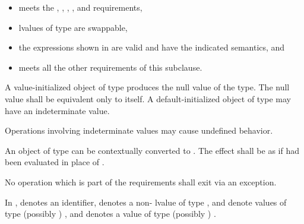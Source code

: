 \begin{itemize}
\item {} meets the ,
, , ,
and  requirements,

\item lvalues of type  are swappable,

\item the expressions shown in  are
valid and have the indicated semantics, and

\item {} meets all the other requirements of this subclause.
\end{itemize}

\pnum
A value-initialized object of type  produces the null value of the type.
The null value shall be equivalent only to itself. A default-initialized object
of type  may have an indeterminate value. \begin{note} Operations involving
indeterminate values may cause undefined behavior. \end{note}

\pnum
An object  of type  can be contextually converted to
. The effect shall be as if 
had been evaluated in place of .

\pnum
No operation which is part of the  requirements shall exit
via an exception.

\pnum
In ,  denotes an identifier, 
denotes a non- lvalue of type ,  and 
denote values of type (possibly ) , and  denotes
a value of type (possibly ) .

